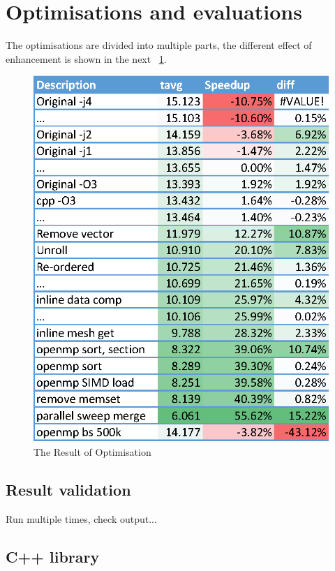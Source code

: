 \documentclass[conference]{IEEEtran}
\newcommand{\fref}[1]{\figurename~\ref{#1}}
\begin{document}
\section{Optimisations and evaluations}
The optimisations are divided into multiple parts, the different effect of enhancement is shown in the next \fref{fig:log}. 
\begin{figure}[!ht]
	\centering
	\includegraphics[width=\columnwidth]{data_log}
	\caption{The Result of Optimisation}
	\label{fig:log}
\end{figure}


\subsection{Result validation}

Run multiple times, check output...


\subsection{C++ library}
\end{document}
